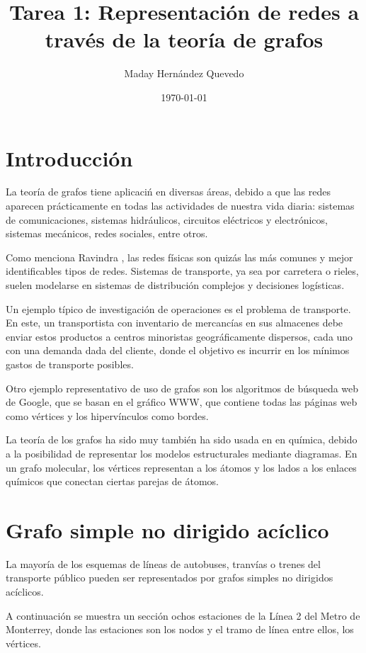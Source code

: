 \documentclass{article}
\title{
Tarea 1: Representación de redes a través de la teoría de grafos
}
\author{Maday Hernández Quevedo}
\date{\today}
\begin{document}
\raggedright
\maketitle

\section*{Introducción}

La teoría de grafos tiene aplicaci\'n en diversas áreas, debido a que las redes aparecen prácticamente en todas las actividades de nuestra vida diaria: sistemas de comunicaciones, sistemas hidráulicos, circuitos eléctricos y electrónicos, sistemas mecánicos, redes sociales, entre otros. 

Como menciona Ravindra \cite{ahuja2017network}, las redes físicas son quizás las más comunes y mejor identificables tipos de redes. Sistemas de transporte, ya sea por carretera o rieles, suelen modelarse en sistemas de distribución complejos y decisiones logísticas.

Un ejemplo típico de investigación de operaciones es el problema de transporte. En este, un transportista con inventario de mercancías en sus almacenes debe enviar estos productos a centros minoristas geográficamente dispersos, cada uno con una demanda dada del cliente, donde el objetivo es incurrir en los mínimos gastos de transporte posibles. 

Otro ejemplo representativo de uso de grafos son los algoritmos de búsqueda web de Google, que se basan en el gráfico WWW, que contiene todas las páginas web como vértices y los  hipervínculos como bordes. \cite{chung2010graph}

La teoría de los grafos ha sido muy también ha sido usada en en química, debido a la posibilidad de representar los modelos estructurales mediante diagramas. En un grafo molecular, los vértices representan a los átomos y los lados a los enlaces químicos que conectan ciertas parejas de átomos. \cite{amador}

\section{Grafo simple no dirigido acíclico}

La mayoría de los esquemas de líneas de autobuses, tranvías o trenes del transporte público pueden ser representados por grafos simples no dirigidos acíclicos.

A continuación se muestra un sección ochos estaciones de la Línea 2 del Metro de Monterrey, donde las estaciones son los nodos y el tramo de línea entre ellos, los vértices. 
\end{document}
